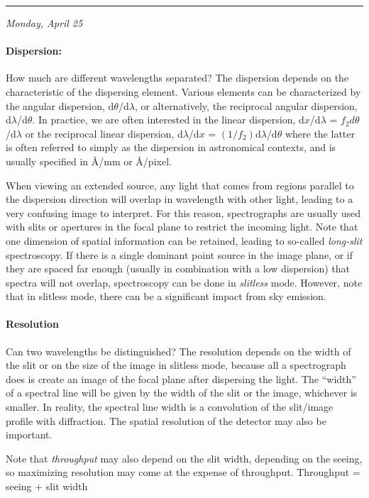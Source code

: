 \documentclass[12pt]{article}
\newcommand{\mynotes}[1]{\textcolor{myBlue}{#1}}
\newcommand{\mydate}[1]{
    \begin{flushright}
        \rule{\textwidth}{0.4pt} %
        \footnotesize\hfill\textit{#1}
    \end{flushright}}
\begin{document}
\mydate{Monday, April 25}

\paragraph{Dispersion:}
\mynotes{How much are different wavelengths separated?}
The dispersion depends on the characteristic of the dispersing element. Various
elements can be characterized by the angular dispersion, d$\theta$/d$\lambda$,
or alternatively, the reciprocal angular dispersion, d$\lambda$/d$\theta$. In
practice, we are often interested in the linear dispersion, d$x$/d$\lambda$ =
$f_{2}d\theta$/d$\lambda$ or the reciprocal linear dispersion, d$\lambda$/d$x$
= $(1/f_{2})$d$\lambda$/d$\theta$ where the latter is often referred to
simply as the dispersion in astronomical contexts, and is usually specified in
\AA{}/mm or \AA{}/pixel.

When viewing an extended source, any light that comes from regions parallel to
the dispersion direction will overlap in wavelength with other light, leading
to a very confusing image to interpret. For this reason, spectrographs are
usually used with slits or apertures in the focal plane to restrict the
incoming light. Note that one dimension of spatial information can be retained,
leading to so-called \textit{long-slit} spectroscopy. If there is a single
dominant point source in the image plane, or if they are spaced far enough
(usually in combination with a low dispersion) that spectra will not overlap,
spectroscopy can be done in \textit{slitless} mode. However, note that in
slitless mode, there can be a significant impact from sky emission.

\paragraph{Resolution}
\mynotes{Can two wavelengths be distinguished?}
The resolution depends on the width of the slit or on the size of the image in
slitless mode, because all a spectrograph does is create an image of the focal
plane after dispersing the light. The ``width'' of a spectral line will be
given by the width of the slit or the image, whichever is smaller. In reality,
the spectral line width is a convolution of the slit/image profile with
diffraction. The spatial resolution of the detector may also be important.

Note that \textit{throughput} may also depend on the slit width, depending on
the seeing, so maximizing resolution may come at the expense of
throughput. \mynotes{Throughput = seeing + slit width}
\end{document}
